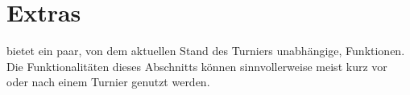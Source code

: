 \section{Extras}

\noindent
\bb bietet ein paar, von dem aktuellen Stand des Turniers unabhängige, Funktionen.\\[.1cm]

\noindent
Die Funktionalitäten dieses Abschnitts können sinnvollerweise meist kurz vor oder nach
einem Turnier genutzt werden.
